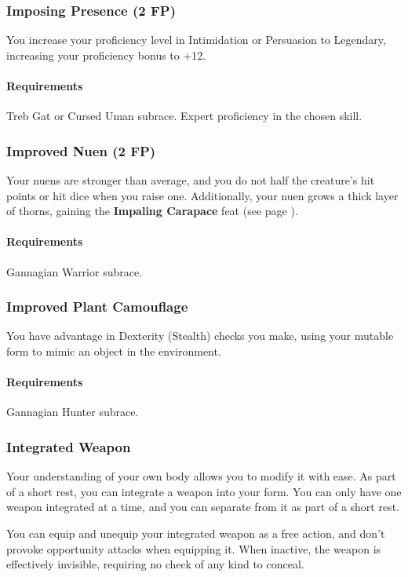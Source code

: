 \subsubsection{Imposing Presence (2 FP)} \label{feat::imposingpresence}
    You increase your proficiency level in Intimidation or Persuasion to Legendary, increasing your proficiency bonus to +12.
    \paragraph{Requirements} Treb Gat or Cursed Uman subrace. Expert proficiency in the chosen skill.
\subsubsection{Improved Nuen (2 FP)} \label{feat::improvednuen}
    Your nuens are stronger than average, and you do not half the creature's hit points or hit dice when you raise one.
    Additionally, your nuen grows a thick layer of thorns, gaining the \textbf{Impaling Carapace} feat (see page \pageref{feat::impalingcarapace}).
    \paragraph{Requirements} Gannagian Warrior subrace.
\subsubsection{Improved Plant Camouflage} \label{feat::improvedplantcamouflage}
    You have advantage in Dexterity (Stealth) checks you make, using your mutable form to mimic an object in the environment.
    \paragraph{Requirements} Gannagian Hunter subrace.
\subsubsection{Integrated Weapon} \label{feat::integratedweapon}
    Your understanding of your own body allows you to modify it with ease.
    As part of a short rest, you can integrate a weapon into your form.
    You can only have one weapon integrated at a time, and you can separate from it as part of a short rest.

    You can equip and unequip your integrated weapon as a free action, and don't provoke opportunity attacks when equipping it.
    When inactive, the weapon is effectively invisible, requiring no check of any kind to conceal.

